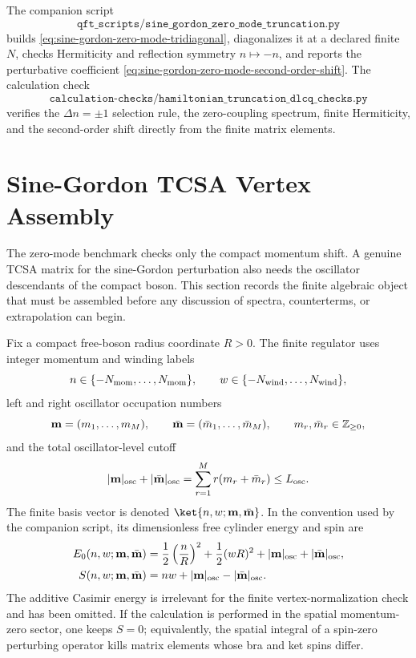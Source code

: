 The companion script
\[
  \texttt{qft\_scripts/sine\_gordon\_zero\_mode\_truncation.py}
\]
builds \eqref{eq:sine-gordon-zero-mode-tridiagonal}, diagonalizes it at a
declared finite \(N\), checks Hermiticity and reflection symmetry
\(n\mapsto -n\), and reports the perturbative coefficient
\eqref{eq:sine-gordon-zero-mode-second-order-shift}.  The calculation check
\[
  \texttt{calculation-checks/hamiltonian\_truncation\_dlcq\_checks.py}
\]
verifies the \(\Delta n=\pm1\) selection rule, the zero-coupling spectrum,
finite Hermiticity, and the second-order shift directly from the finite
matrix elements.

\section{Sine-Gordon TCSA Vertex Assembly}
\label{sec:sine-gordon-compact-boson-tcsa-vertex-assembly}

The zero-mode benchmark checks only the compact momentum shift.  A genuine
TCSA matrix for the sine-Gordon perturbation also needs the oscillator
descendants of the compact boson.  This section records the finite algebraic
object that must be assembled before any discussion of spectra, counterterms,
or extrapolation can begin.

Fix a compact free-boson radius coordinate \(R>0\).  The finite regulator
uses integer momentum and winding labels
\[
  n\in\{-N_{\rm mom},\ldots,N_{\rm mom}\},
  \qquad
  w\in\{-N_{\rm wind},\ldots,N_{\rm wind}\},
\]
left and right oscillator occupation numbers
\[
  {\bf m}=(m_1,\ldots,m_M),\qquad
  \bar{\bf m}=(\bar m_1,\ldots,\bar m_M),
  \qquad m_r,\bar m_r\in\mathbb Z_{\geq0},
\]
and the total oscillator-level cutoff
\[
  |{\bf m}|_{\rm osc}+|\bar{\bf m}|_{\rm osc}
  =
  \sum_{r=1}^{M}r(m_r+\bar m_r)
  \leq L_{\rm osc}.
\]
The finite basis vector is denoted
\(\ket{n,w;{\bf m},\bar{\bf m}}\).  In the convention used by the companion
script, its dimensionless free cylinder energy and spin are
\begin{align}
  E_0(n,w;{\bf m},\bar{\bf m})
  &=
  \frac12\left(\frac nR\right)^2
  +
  \frac12(wR)^2
  +
  |{\bf m}|_{\rm osc}
  +
  |\bar{\bf m}|_{\rm osc},
  \label{eq:sine-gordon-tcsa-free-energy-coordinate}
  \\
  S(n,w;{\bf m},\bar{\bf m})
  &=
  nw+|{\bf m}|_{\rm osc}-|\bar{\bf m}|_{\rm osc}.
  \label{eq:sine-gordon-tcsa-spin-coordinate}
\end{align}
The additive Casimir energy is irrelevant for the finite vertex-normalization
check and has been omitted.  If the calculation is performed in the spatial
momentum-zero sector, one keeps \(S=0\); equivalently, the spatial integral
of a spin-zero perturbing operator kills matrix elements whose bra and ket
spins differ.

